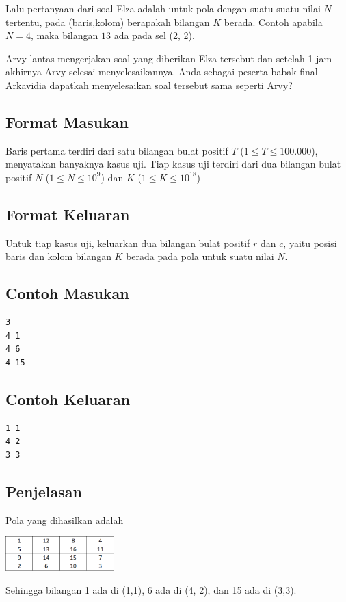 \documentclass{article}
\begin{document}
Lalu pertanyaan dari soal Elza adalah untuk pola dengan suatu suatu nilai $N$ tertentu, pada (baris,kolom) berapakah bilangan 
$K$ berada. Contoh apabila $N = 4$, maka bilangan $13$ ada pada sel (2, 2). 

Arvy lantas mengerjakan soal yang diberikan Elza tersebut dan setelah 1 jam akhirnya Arvy selesai menyelesaikannya.
Anda sebagai peserta babak final Arkavidia dapatkah menyelesaikan soal tersebut sama seperti Arvy?

\subsection*{Format Masukan}

Baris pertama terdiri dari satu bilangan bulat positif $T$ ($1 \leq T \leq 100.000$), menyatakan banyaknya kasus uji.
Tiap kasus uji terdiri dari dua bilangan bulat positif $N$ ($1 \leq N \leq 10^{9}$) dan $K$ ($1 \leq K \leq 10^{18}$)

\subsection*{Format Keluaran}

Untuk tiap kasus uji, keluarkan dua bilangan bulat positif $r$ dan $c$, yaitu posisi baris dan kolom bilangan $K$ berada pada 
pola untuk suatu nilai $N$.

\pagebreak

\begin{multicols}{2}
\subsection*{Contoh Masukan}
\begin{lstlisting}
3
4 1
4 6
4 15
\end{lstlisting}
\columnbreak
\subsection*{Contoh Keluaran}
\begin{lstlisting}
1 1
4 2
3 3
\end{lstlisting}
\vfill
\null
\end{multicols}

\subsection*{Penjelasan}
Pola yang dihasilkan adalah
\begin{center}
    \includegraphics[height=50px]{n=4.PNG}
\end{center}
Sehingga bilangan 1 ada di (1,1), 6 ada di (4, 2), dan 15 ada di (3,3).

\pagebreak
\end{document}
